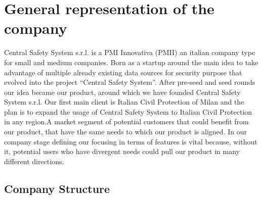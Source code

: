 \documentclass[../main.tex]{subfiles}
\begin{document}
    \chapter{General representation of the company}
    Central Safety System s.r.l. is a PMI Innovativa (PMII) an italian company type for small and medium companies.
    Born as a startup around the main idea to take advantage of multiple already existing data sources for security purpose that evolved into the project “Central Safety System”. After pre-seed and seed rounds our idea became our product, around which we have founded Central Safety System s.r.l.
    Our first main client is Italian Civil Protection of Milan and the plan is to expand the usage of Central Safety System to Italian Civil Protection in any region.A market segment of potential customers that could benefit from our product, that have the same needs to which our product is aligned.
    In our company stage defining our focusing in terms of features is vital because, without it, potential users who have divergent needs could pull our product in many different directions.

    \section{Company Structure}
\end{document}
